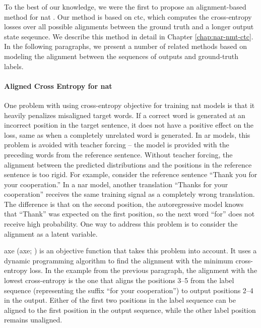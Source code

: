 To the best of our knowledge, we were the first to propose an alignment-based
method for \ac{nat} \citep{libovicky-helcl-2018-end}. Our method is based on
\acf{ctc}, which computes the cross-entropy losses over all
possible alignments between the ground truth and a longer output state
seqeunce. We describe this method in detail in Chapter \ref{chap:nar-nmt-ctc}.
In the following paragraphs, we present a number of related methods based on
modeling the alignment between the sequences of outputs and ground-truth
labels.

\paragraph{Aligned Cross Entropy for \ac{nat}} One problem with using
cross-entropy objective for training \ac{nat} models is that it heavily
penalizes misaligned target words. If a correct word is generated at an
incorrect position in the target sentence, it does not have a positive effect
on the loss, same as when a completely unrelated word is generated. In \acl{ar}
models, this problem is avoided with teacher forcing -- the model is provided
with the preceding words from the reference sentence. Without teacher forcing,
the alignment between the predicted distributions and the positions in the
reference sentence is too rigid. For example, consider the reference sentence
``Thank you for your cooperation.'' In a \acl{nar} model, another translation
``Thanks for your cooperation'' receives the same training signal as a
completely wrong translation. The difference is that on the second position,
the autoregressive model knows that ``Thank'' was expected on the first
position, so the next word ``for'' does not receive high probability.  One way
to address this problem is to consider the alignment as a latent variable.

\Acl{axe}  (\acs{axe}; \citealp{ghazvininejad2020aligned}) is an
objective function that takes this problem into account. It uses a dynamic
programming algorithm to find the alignment with the minimum cross-entropy
loss. In the example from the previous paragraph, the alignment with the lowest
cross-entropy is the one that aligns the positions 3--5 from the label sequence
(representing the suffix ``for your cooperation'') to output positions 2--4 in
the output. Either of the first two positions in the label sequence can be
aligned to the first position in the output sequence, while the other label
position remains unaligned.

